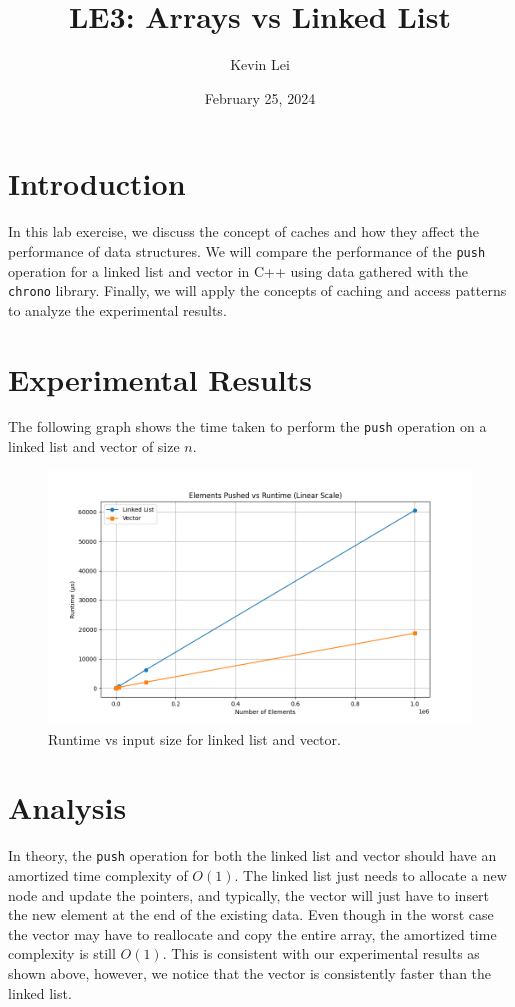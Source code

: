 \documentclass{article}
\title{LE3: Arrays vs Linked List}
\author{Kevin Lei}
\date{February 25, 2024}
\begin{document}
\maketitle

\section{Introduction}
In this lab exercise, we discuss the concept of caches and how they affect the performance of data structures. 
We will compare the performance of the \texttt{push} operation for a linked list and vector in C++ using data gathered with the \texttt{chrono} library.
Finally, we will apply the concepts of caching and access patterns to analyze the experimental results.

\section{Experimental Results}
The following graph shows the time taken to perform the \texttt{push} operation on a linked list and vector of size $n$.
\begin{figure}[H]
    \centering
    \includegraphics[width=\textwidth]{./images/linear.png}
    \caption{Runtime vs input size for linked list and vector.}
\end{figure}

\section{Analysis}
In theory, the \texttt{push} operation for both the linked list and vector should have an amortized time complexity of $O(1)$.
The linked list just needs to allocate a new node and update the pointers, and typically, the vector will just have to insert the new element at the end of the existing data.
Even though in the worst case the vector may have to reallocate and copy the entire array, the amortized time complexity is still $O(1)$.
This is consistent with our experimental results as shown above, however, we notice that the vector is consistently faster than the linked list.
\end{document}
